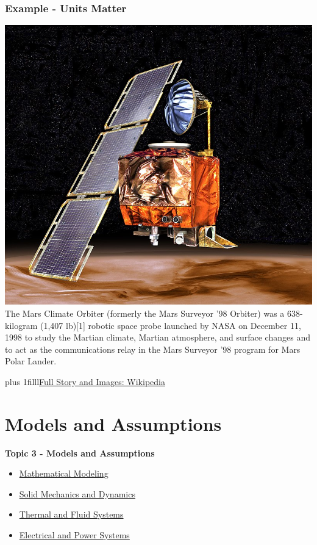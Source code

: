 \documentclass[fleqn]{beamer} %
\newcommand{\sectionIIItitle}{Models and Assumptions}
\newcommand{\sectionIIsubsectionIVtitle}{Example - Units Matter}
\newcommand{\sectionIIIsubsectionItitle}{Mathematical Modeling}
\newcommand{\sectionIIIsubsectionIItitle}{Solid Mechanics and Dynamics}
\newcommand{\sectionIIIsubsectionIIItitle}{Thermal and Fluid Systems}
\newcommand{\sectionIIIsubsectionIVtitle}{Electrical and Power Systems}
\newcommand{\btVFill}{\vskip0pt plus 1filll}
\begin{document}
			\begin{frame}
				\frametitle{\sectionIIsubsectionIVtitle}
				\bigskip
				\includegraphics[scale=.1]{images/mars_orbiter.jpg}
				The Mars Climate Orbiter (formerly the Mars Surveyor '98 Orbiter) was a 638-kilogram (1,407 lb)[1] robotic space probe launched by NASA on December 11, 1998 to study the Martian climate, Martian atmosphere, and surface changes and to act as the communications relay in the Mars Surveyor '98 program for Mars Polar Lander. 
		
				\btVFill {\tiny \href{https://en.wikipedia.org/wiki/Mars_Climate_Orbiter}{Full Story and Images: Wikipedia} }
			\end{frame}
		
	\section{\sectionIIItitle}\label{sectionIII}

		\begin{frame}
			\large \textbf{Topic 3 - \sectionIIItitle} \vspace{3mm}\\

			\begin{itemize}
				\item \hyperlink{sectionIIIsubsectionI}{\sectionIIIsubsectionItitle} \vspc %
				\item \hyperlink{sectionIIIsubsectionII}{\sectionIIIsubsectionIItitle} \vspc %
				\item \hyperlink{sectionIIIsubsectionIII}{\sectionIIIsubsectionIIItitle} \vspc %
				\item \hyperlink{sectionIIIsubsectionIV}{\sectionIIIsubsectionIVtitle} \vspc %
			\end{itemize}

		\end{frame}
\end{document}
